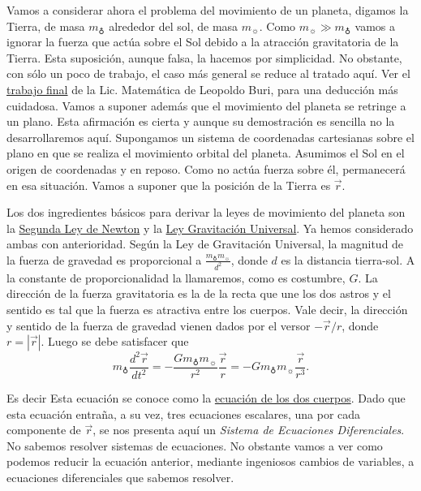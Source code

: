 Vamos a considerar ahora el problema del movimiento de un planeta, digamos la Tierra, de masa $m_{\earth}$ alrededor del sol, de masa $m_{\sun}$. Como
$m_{\sun}\gg m_{\earth}$ vamos a ignorar la fuerza que actúa sobre el Sol debido a la atracción gravitatoria de la Tierra. Esta suposición, aunque falsa, la hacemos
por simplicidad. No obstante, con sólo un poco de trabajo, el caso más general se reduce al tratado aquí. Ver el \href{https://drive.google.com/file/d/0B80iJ0HgObRRbUtUQ2hFQ0FlTG8/view}{trabajo final} de la Lic. Matemática de Leopoldo Buri,
para una deducción más cuidadosa. Vamos a suponer además que el movimiento del planeta se retringe a un plano. Esta afirmación es cierta y aunque su demostración
es sencilla no la desarrollaremos aquí.
Supongamos un sistema de coordenadas cartesianas sobre el plano en que se realiza el movimiento orbital del planeta. Asumimos el Sol en el origen de coordenadas y en
reposo. Como no actúa fuerza sobre él, permanecerá en esa situación. Vamos a suponer que la posición de la Tierra es $\vec{r}$.

Los dos ingredientes básicos para derivar la leyes de movimiento del planeta son la
\href{http://es.wikipedia.org/wiki/Leyes_de_Newton\#Segunda_ley_de_Newton_o_ley_de_fuerza}{Segunda Ley de Newton} y la
\href{http://es.wikipedia.org/wiki/Ley_de_gravitación_universal}{Ley Gravitación Universal}. Ya hemos considerado ambas con anterioridad.
Según la Ley de Gravitación Universal, la magnitud de la fuerza de gravedad es proporcional a $\frac{m_{\earth}m_{\sun}}{d^2}$, donde $d$ es la distancia tierra-sol.
A la constante de proporcionalidad la llamaremos, como es costumbre, $G$. La dirección de la fuerza gravitatoria es la de la recta que une los dos astros y
el sentido es tal que la fuerza es atractiva entre los cuerpos. Vale decir, la dirección y sentido de la
fuerza de gravedad vienen dados por el versor $-\vec{r}/r$, donde $r=|\vec{r}|$. Luego se debe satisfacer que
\[m_{\earth}\frac{d^2\vec{r}}{dt^2}=-\frac{Gm_{\earth}m_{\sun}}{r^2}\frac{\vec{r}}{r}=-Gm_{\earth}m_{\sun}\frac{\vec{r}}{r^3}. \]



Es decir
Esta ecuación se conoce como la \href{http://es.wikipedia.org/wiki/Problema_de_los_dos_cuerpos}{ecuación de los dos cuerpos}.
Dado que esta ecuación entraña, a su vez, tres ecuaciones escalares, una por cada
componente de $\vec{r}$, se nos presenta aquí un \emph{Sistema de Ecuaciones Diferenciales}. No sabemos resolver sistemas de ecuaciones. No obstante vamos
a ver como podemos reducir la ecuación anterior, mediante ingeniosos cambios de
variables, a ecuaciones diferenciales que sabemos resolver.


